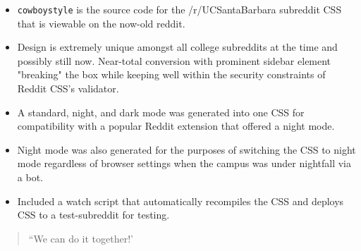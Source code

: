\documentclass[10pt,letter,ragged2e]{altacv}
\begin{document}
\begin{paracol}{2}
\divider


\begin{itemize}
\item \texttt{cowboystyle} is the source code for the /r/UCSantaBarbara subreddit CSS that is viewable on the now-old reddit.
\item Design is extremely unique amongst all college subreddits at the time and possibly still now. Near-total conversion with prominent sidebar element "breaking" the box while keeping well within the security constraints of Reddit CSS's validator.
\item A standard, night, and dark mode was generated into one CSS for compatibility with a popular Reddit extension that offered a night mode.
\item Night mode was also generated for the purposes of switching the CSS to night mode regardless of browser settings when the campus was under nightfall via a bot.
\item Included a watch script that automatically recompiles the CSS and deploys CSS to a test-subreddit for testing.
\end{itemize}

\newpage

\switchcolumn


\begin{quote}
``We can do it together!'
\end{quote}


   

  

 


\medskip




\end{paracol}
\end{document}
